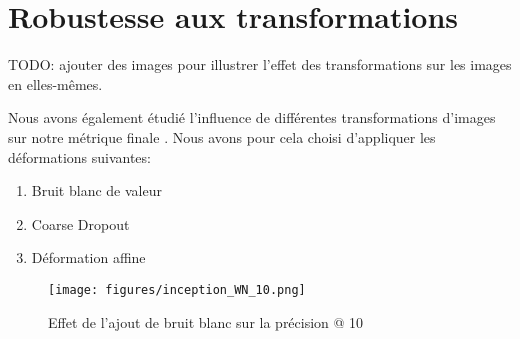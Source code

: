 \section{Robustesse aux transformations}

TODO: ajouter des images pour illustrer l'effet des transformations sur les images en elles-mêmes.

Nous avons \'egalement \'etudi\'e l'influence de diff\'erentes transformations d'images sur notre m\'etrique finale
.
Nous avons pour cela choisi d'appliquer les d\'eformations suivantes: 
\begin{enumerate}
    \item Bruit blanc de valeur
    \item Coarse Dropout
    \item D\'eformation affine
\end{enumerate}

\begin{figure}
    \centering
    \texttt{[image: figures/inception\_WN\_10.png]}
    \label{fig:inception_WN_10}
    \caption{Effet de l'ajout de bruit blanc sur la précision @ 10}
\end{figure}
